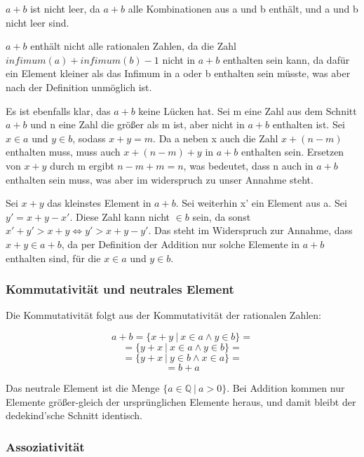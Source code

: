 \documentclass[12pt]{article}
\begin{document}
    $a + b$ ist nicht leer, da $a + b$ alle Kombinationen aus a und b enthält, und a und b nicht leer sind.

    $a + b$ enthält nicht alle rationalen Zahlen, da die Zahl $infimum(a) + infimum(b) - 1$ nicht in $a + b$
    enthalten sein kann, da dafür ein Element kleiner als das Infimum in a oder b enthalten sein müsste, was
    aber nach der Definition unmöglich ist.

    Es ist ebenfalls klar, das $a + b$ keine Lücken hat.
    Sei m eine Zahl aus dem Schnitt $a + b$ und n eine Zahl die größer als m ist, aber nicht in $a + b$ enthalten ist.
    Sei $x \in a$ und $y \in b$, sodass $x + y = m$. Da a neben x auch die Zahl $x + (n - m)$ enthalten muss,
    muss auch $x + (n - m) + y$ in $a + b$ enthalten sein. Ersetzen von $x + y$ durch m ergibt $n - m + m = n$,
    was bedeutet, dass n auch in $a + b$ enthalten sein muss, was aber im widerspruch zu unser Annahme steht.

    Sei $x + y$ das kleinstes Element in $a + b$. Sei weiterhin x' ein Element aus a.
    Sei $y' = x + y - x'$. Diese Zahl kann nicht $\in b$ sein, da sonst $x' + y' > x + y \Leftrightarrow y' > x + y - y'$.
    Das steht im Widerspruch zur Annahme, dass $x + y \in a + b$, da per Definition der Addition nur solche Elemente
    in $a + b$ enthalten sind, für die $x \in a$ und $y \in b$.

    \subsubsection{Kommutativität und neutrales Element}

    Die Kommutativität folgt aus der Kommutativität der rationalen Zahlen:

    \[a + b = \{x + y \mspace{4mu} | \mspace{4mu} x \in a \land y \in b\} =\]
    \[= \{y + x \mspace{4mu} | \mspace{4mu} x \in a \land y \in b\} =\]
    \[= \{y + x \mspace{4mu} | \mspace{4mu} y \in b \land x \in a\} =\]
    \[= b + a\]

    Das neutrale Element ist die Menge $\{a \in \mathbb{Q} \mspace{4mu} | \mspace{4mu} a  > 0\}$.
    Bei Addition kommen nur Elemente größer-gleich der ursprünglichen Elemente heraus, und damit bleibt
    der dedekind'sche Schnitt identisch.

    \subsubsection{Assoziativität}
\end{document}
